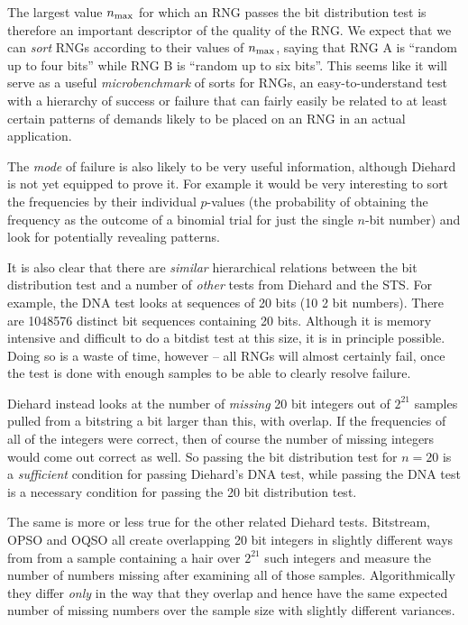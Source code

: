 \documentclass[12pt]{book}
\begin{document}
The largest value $n_{\rm max}$ for which an RNG passes the bit
distribution test is therefore an important descriptor of the quality of
the RNG.  We expect that we can {\em sort} RNGs according to their
values of $n_{\rm max}$, saying that RNG A is ``random up to four bits''
while RNG B is ``random up to six bits''.  This seems like it will
serve as a useful {\em microbenchmark} of sorts for RNGs, an
easy-to-understand test with a hierarchy of success or failure that can
fairly easily be related to at least certain patterns of demands likely
to be placed on an RNG in an actual application.

The {\em mode} of failure is also likely to be very useful information,
although Diehard is not yet equipped to prove it.  For example it would
be very interesting to sort the frequencies by their individual
$p$-values (the probability of obtaining the frequency as the outcome of
a binomial trial for just the single $n$-bit number) and look for
potentially revealing patterns.

It is also clear that there are {\em similar} hierarchical relations
between the bit distribution test and a number of {\em other} tests from
Diehard and the STS.  For example, the DNA test looks at sequences of 20
bits (10 2 bit numbers).  There are 1048576 distinct bit sequences
containing 20 bits.  Although it is memory intensive and difficult to do
a bitdist test at this size, it is in principle possible.  Doing so is a
waste of time, however -- all RNGs will almost certainly fail, once the
test is done with enough samples to be able to clearly resolve failure.

Diehard instead looks at the number of {\em missing} 20 bit integers out
of $2^{21}$ samples pulled from a bitstring a bit larger than this, with
overlap.  If the frequencies of all of the integers were correct, then
of course the number of missing integers would come out correct as well.
So passing the bit distribution test for $n = 20$ is a {\em sufficient}
condition for passing Diehard's DNA test, while passing the DNA test is
a necessary condition for passing the 20 bit distribution test.  

The same is more or less true for the other related Diehard tests.
Bitstream, OPSO and OQSO all create overlapping 20 bit integers in
slightly different ways from from a sample containing a hair over
$2^{21}$ such integers and measure the number of numbers missing after
examining all of those samples.  Algorithmically they differ {\em only}
in the way that they overlap and hence have the same expected number of
missing numbers over the sample size with slightly different variances.
\end{document}
